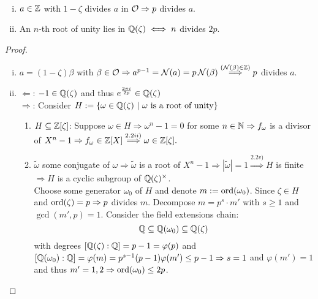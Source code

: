 \begin{Lem}\ \vspace*{-\baselineskip}
\begin{enumerate}[i)]
\item $a \in \mathbb{Z}$ with $1- \zeta$ divides $a$ in $\mathcal{O} \Rightarrow p$ divides $a$.
\item An $n$-th root of unity lies in $\mathbb{Q}(\zeta) \iff n $ divides $2p$.
\end{enumerate}
\end{Lem}
\begin{proof}
\begin{enumerate}[i)]
\item $a=(1- \zeta)\beta$ with $\beta \in \mathcal{O} \Rightarrow a^{p-1}=\operatorname{\mathcal{N}}(a)=p\operatorname{\mathcal{N}}(\beta) \stackrel{(\operatorname{\mathcal{N}}(\beta) \in \mathbb{Z})}{\Longrightarrow} p$ divides $a$.
\item \glqq $\Leftarrow$\grqq: $-1 \in \mathbb{Q}(\zeta)$ and thus $e^{\frac{2\pi i}{2p}} \in \mathbb{Q}(\zeta)$\\
\glqq $\Rightarrow$\grqq: Consider $H:=\{\omega \in \Q(\zeta) \ | \ \omega \text{ is a root of unity} \}$
\begin{enumerate}
\item $H \subseteq \mathbb{Z}[\zeta]$: Suppose $\omega \in H \Rightarrow \omega^n-1 = 0$ for some $n \in \mathbb{N} \Rightarrow f_\omega$ is a divisor of $X^n-1 \Rightarrow f_\omega \in \mathbb{Z}[X] \stackrel{2.2 ii)}{\Longrightarrow} \omega \in \mathbb{Z}[\zeta].$
\item $\tilde{\omega}$ some conjugate of $\omega \Rightarrow \tilde{\omega}$ is a root of $X^n-1 \Rightarrow |\tilde{\omega}|=1 \stackrel{2.2 v)}{\Longrightarrow} H$ is finite $\Rightarrow H$ is a cyclic subgroup of $\mathbb{Q}(\zeta)^\times$.\\
Choose some generator $\omega_0$ of $H$ and denote $m:= \operatorname{ord}(\omega_0)$. Since $\zeta \in H$ and $\operatorname{ord}(\zeta)=p \Rightarrow p$ divides $m$. Decompose $m=p^s \cdot m'$ with $s \geq 1$ and $\gcd(m',p)=1$. Consider the field extensions chain:
\[\mathbb{Q} \subseteq \mathbb{Q}(\omega_0) \subseteq \mathbb{Q}(\zeta)\]
with degrees $[\mathbb{Q}(\zeta):\mathbb{Q}]=p-1=\varphi(p)$ and $[\Q(\omega_0):\Q]=\varphi(m) = \linebreak p^{s-1}(p-1)\varphi(m') \leq p-1 \Rightarrow s=1$ and $\varphi(m')=1$ and thus $m'=1,2 \Rightarrow \operatorname{ord}(\omega_0) \leq 2p$.
\end{enumerate}
\end{enumerate}
\end{proof}

